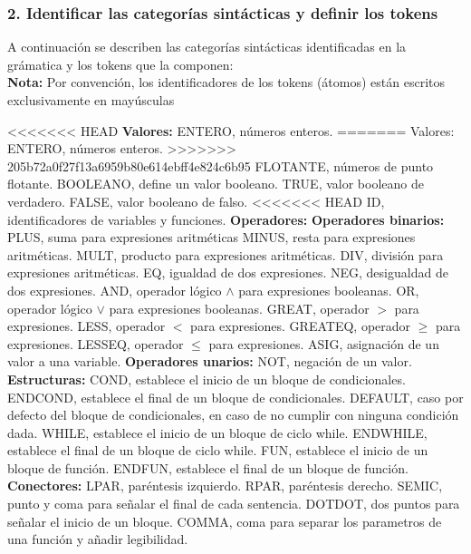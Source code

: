 \documentclass[12pt]{article}
\begin{document}
\subsubsection*{2. Identificar las categorías sintácticas y definir los tokens}
A continuación se describen las categorías sintácticas identificadas en la grámatica y los tokens que la componen:\\
\textbf{Nota:} Por convención, los identificadores de los tokens (átomos) están escritos exclusivamente en mayúsculas 
\begin{outline}
<<<<<<< HEAD
\1 \textbf{Valores:}
	\2 ENTERO, números enteros.
=======
\1 Valores:
    \2 ENTERO, números enteros.
>>>>>>> 205b72a0f27f13a6959b80e614ebff4e824c6b95
    \2 FLOTANTE, números de punto flotante.
    \2 BOOLEANO, define un valor booleano.
    \3 TRUE, valor booleano de verdadero.
    \3 FALSE, valor booleano de falso.
<<<<<<< HEAD
    \3 ID, identificadores de variables y funciones.
\1 \textbf{Operadores:}
	\2 \textbf{Operadores binarios:}
		\3 PLUS, suma para expresiones aritméticas
    	\3 MINUS, resta para expresiones aritméticas.
    	\3 MULT, producto para expresiones aritméticas.
    	\3 DIV, división para expresiones aritméticas.
    	\3 EQ, igualdad de dos expresiones.
        \3 NEG, desigualdad de dos expresiones.
    	\3 AND, operador lógico $\land$ para expresiones booleanas.
    	\3 OR, operador lógico $\lor$ para expresiones booleanas.
    	\3 GREAT, operador $>$  para expresiones.
    	\3 LESS, operador $<$ para expresiones.
    	\3 GREATEQ, operador $\geq$ para expresiones.
        \3 LESSEQ, operador $\leq$ para expresiones.
        \3 ASIG, asignación de un valor a una variable.
 	\2 \textbf{Operadores unarios:}
    	\3 NOT, negación de un valor.
 \1 \textbf{Estructuras:}
 	\2 COND, establece el inicio de un bloque de condicionales.
    \2 ENDCOND, establece el final de un bloque de condicionales.
    \2 DEFAULT, caso por defecto del bloque de condicionales, en caso de no cumplir con ninguna condición dada.
    \2 WHILE, establece el inicio de un bloque de ciclo while.
    \2 ENDWHILE, establece el final de un bloque de ciclo while.
    \2 FUN, establece el inicio de un bloque de función.
    \2 ENDFUN, establece el final de un bloque de función.
 \1 \textbf{Conectores:}
 	\2 LPAR, paréntesis izquierdo.
    \2 RPAR, paréntesis derecho.
    \2 SEMIC, punto y coma para señalar el final de cada sentencia.
    \2 DOTDOT, dos puntos para señalar el inicio de un bloque.
    \2 COMMA, coma para separar los parametros de una función y añadir legibilidad.

\end{outline}
\end{document}
